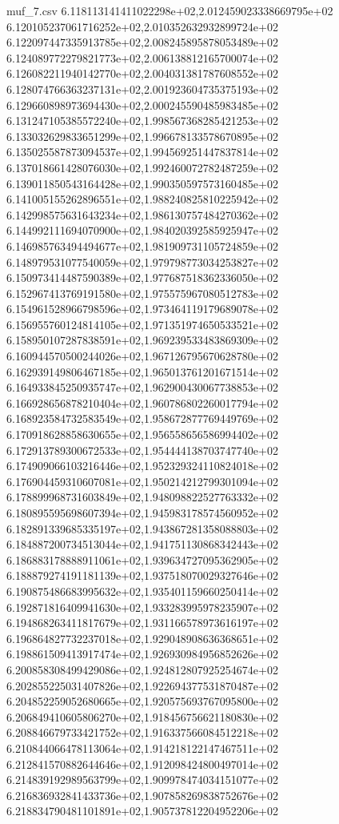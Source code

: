 \begin{filecontents*}{muf_7.csv}
6.118113141411022298e+02,2.012459023338669795e+02
6.120105237061716252e+02,2.010352632932899724e+02
6.122097447335913785e+02,2.008245895878053489e+02
6.124089772279821773e+02,2.006138812165700074e+02
6.126082211940142770e+02,2.004031381787608552e+02
6.128074766363237131e+02,2.001923604735375193e+02
6.129660898973694430e+02,2.000245590485983485e+02
6.131247105385572240e+02,1.998567368285421253e+02
6.133032629833651299e+02,1.996678133578670895e+02
6.135025587873094537e+02,1.994569251447837814e+02
6.137018661428076030e+02,1.992460072782487259e+02
6.139011850543164428e+02,1.990350597573160485e+02
6.141005155262896551e+02,1.988240825810225942e+02
6.142998575631643234e+02,1.986130757484270362e+02
6.144992111694070900e+02,1.984020392585925947e+02
6.146985763494494677e+02,1.981909731105724859e+02
6.148979531077540059e+02,1.979798773034253827e+02
6.150973414487590389e+02,1.977687518362336050e+02
6.152967413769191580e+02,1.975575967080512783e+02
6.154961528966798596e+02,1.973464119179689078e+02
6.156955760124814105e+02,1.971351974650533521e+02
6.158950107287838591e+02,1.969239533483869309e+02
6.160944570500244026e+02,1.967126795670628780e+02
6.162939149806467185e+02,1.965013761201671514e+02
6.164933845250935747e+02,1.962900430067738853e+02
6.166928656878210404e+02,1.960786802260017794e+02
6.168923584732583549e+02,1.958672877769449769e+02
6.170918628858630655e+02,1.956558656586994402e+02
6.172913789300672533e+02,1.954444138703747740e+02
6.174909066103216446e+02,1.952329324110824018e+02
6.176904459310607081e+02,1.950214212799301094e+02
6.178899968731603849e+02,1.948098822527763332e+02
6.180895595698607394e+02,1.945983178574560952e+02
6.182891339685335197e+02,1.943867281358088803e+02
6.184887200734513044e+02,1.941751130868342443e+02
6.186883178888911061e+02,1.939634727095362905e+02
6.188879274191181139e+02,1.937518070029327646e+02
6.190875486683995632e+02,1.935401159660250414e+02
6.192871816409941630e+02,1.933283995978235907e+02
6.194868263411817679e+02,1.931166578973616197e+02
6.196864827732237018e+02,1.929048908636368651e+02
6.198861509413917474e+02,1.926930984956852626e+02
6.200858308499429086e+02,1.924812807925254674e+02
6.202855225031407826e+02,1.922694377531870487e+02
6.204852259052680665e+02,1.920575693767095800e+02
6.206849410605806270e+02,1.918456756621180830e+02
6.208846679733421752e+02,1.916337566084512218e+02
6.210844066478113064e+02,1.914218122147467511e+02
6.212841570882644646e+02,1.912098424800497014e+02
6.214839192989563799e+02,1.909978474034151077e+02
6.216836932841433736e+02,1.907858269838752676e+02
6.218834790481101891e+02,1.905737812204952206e+02

\end{filecontents*}
